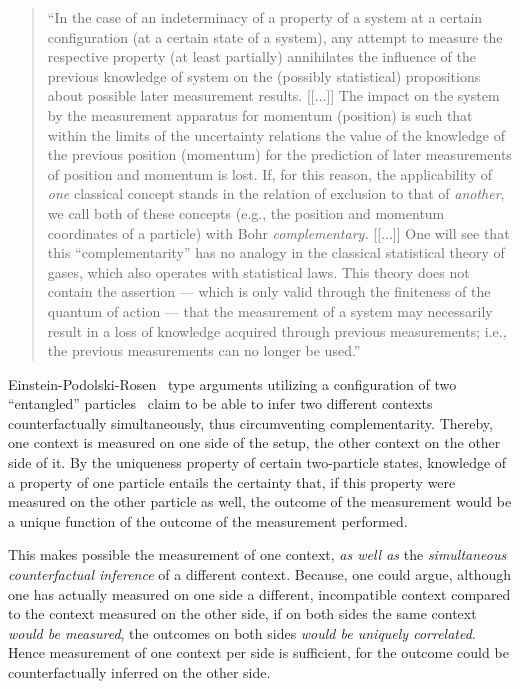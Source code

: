 \documentclass[rmp,amsfonts,showpacs,showkeys,twocolumn]{revtex4}
\begin{document}
\begin{quote}
{  ``In the case of  an indeterminacy of a property of a system at a certain configuration
(at a certain state of a system), any attempt to measure the respective property (at least partially)
annihilates the influence of the previous knowledge of system on the (possibly statistical) propositions
about possible later measurement results.
[[$\ldots$]]
The impact
on the system by the  measurement apparatus for momentum (position) is such that
within the limits of the uncertainty relations
the value of the knowledge of the previous position (momentum) for the
prediction of later measurements of position and momentum is lost.
If, for this reason, the applicability of {\em one} classical concept stands in the relation of
exclusion to that of {\em another}, we call both of these
concepts (e.g., the position and momentum coordinates of a particle) with Bohr {\em complementary.}
[[$\ldots$]]
One will see that this ``complementarity''
has no analogy in the classical statistical theory of gases,
which also operates with statistical laws.
This theory does not contain the assertion --- which is only valid through the finiteness of the
quantum of action --- that the measurement of a system may necessarily result in a loss
of knowledge acquired through previous measurements; i.e., the previous
measurements can no longer be used.''
}
\end{quote}

Einstein-Podolski-Rosen~\cite{epr} type arguments  utilizing a configuration
of two ``entangled'' particles~\cite{schrodinger,CambridgeJournals:1737068,CambridgeJournals:2027212}
claim to be able to infer two different contexts counterfactually simultaneously, thus circumventing complementarity.
Thereby, one context is measured on one side of the setup, the other context on the other side of it.
By the uniqueness property  of certain two-particle states,
knowledge of a property of one particle entails the certainty
that, if this property were measured on the other particle as well, the outcome of the measurement would be
a unique function of the outcome of the measurement performed.

This makes possible the measurement of one context, {\em as well as} the {\em simultaneous counterfactual inference} of a different context.
Because, one could argue, although one has actually measured on one side a different, incompatible context compared to the context measured on the other side,
if on both sides the same  context {\em would be measured}, the outcomes on both sides {\em would be uniquely correlated}.
Hence measurement of one context per side is sufficient, for the outcome could be counterfactually inferred on the other side.
\end{document}
